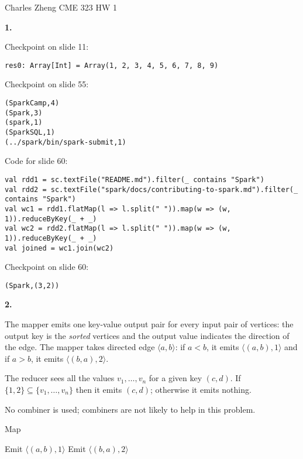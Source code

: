 \documentclass[11pt]{article}
\begin{document}
\newcommand{\tr}{\text{tr}}
\newcommand{\E}{\textbf{E}}
\newcommand{\diag}{\text{diag}}
\newcommand{\argmax}{\text{argmax}}
\newcommand{\Cov}{\text{Cov}}
\newcommand{\Var}{\text{Var}}
\renewcommand{\thefootnote}{\fnsymbol{footnote}}

Charles Zheng CME 323 HW 1

\noindent\textbf{1.}

Checkpoint on slide 11:
\begin{verbatim}
res0: Array[Int] = Array(1, 2, 3, 4, 5, 6, 7, 8, 9)
\end{verbatim}

Checkpoint on slide 55:
\begin{verbatim}
(SparkCamp,4)
(Spark,3)
(spark,1)
(SparkSQL,1)
(../spark/bin/spark-submit,1)
\end{verbatim}

Code for slide 60:
\begin{verbatim}
val rdd1 = sc.textFile("README.md").filter(_ contains "Spark")
val rdd2 = sc.textFile("spark/docs/contributing-to-spark.md").filter(_ contains "Spark")
val wc1 = rdd1.flatMap(l => l.split(" ")).map(w => (w, 1)).reduceByKey(_ + _)
val wc2 = rdd2.flatMap(l => l.split(" ")).map(w => (w, 1)).reduceByKey(_ + _)
val joined = wc1.join(wc2)
\end{verbatim}

Checkpoint on slide 60:
\begin{verbatim}
(Spark,(3,2))
\end{verbatim}

\noindent\textbf{2.}

The mapper emits one key-value output pair for every input pair of
vertices: the output key is the \emph{sorted} vertices and the output
value indicates the direction of the edge.  The mapper takes directed
edge $\langle a, b\rangle$: if $a < b$, it emits $\langle (a, b), 1
\rangle$ and if $a > b$, it emits $\langle (b, a), 2 \rangle$.

The reducer sees all the values $v_1, \hdots, v_n$ for a given key
$(c, d)$.  If $\{1, 2\} \subseteq \{v_1,\hdots, v_n\}$ then it emits
$(c, d)$; otherwise it emits nothing.

No combiner is used; combiners are not likely to help in this problem.

\begin{algorithm}[H]
\caption{Map}
\begin{algorithmic}
      \State Emit $\langle (a, b), 1 \rangle$
  \Else
      \State Emit $\langle (b, a), 2 \rangle$
  \EndIf
\EndFunction
\end{algorithmic}
\end{algorithm}
\end{document}
